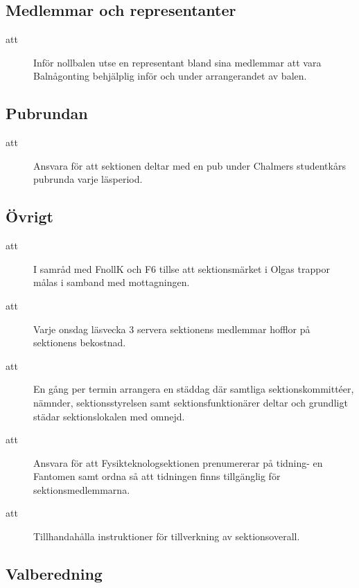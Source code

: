 \subsection{Medlemmar och representanter}

\begin{description}
\item[att] Inför nollbalen utse en representant bland sina medlemmar att vara Balnågonting behjälplig inför och under arrangerandet av balen.
\end{description}

\subsection{Pubrundan}
\begin{description}
\item[att] Ansvara för att sektionen deltar med en pub under Chalmers studentkårs pubrunda varje läsperiod.

\end{description}


\subsection{Övrigt}
\begin{description}
\item[att] I samråd med FnollK och F6 tillse att sektionsmärket i Olgas trappor målas i samband med mottagningen.

\item[att] Varje onsdag läsvecka 3 servera sektionens medlemmar hofflor på sektionens bekostnad.

\item[att] En gång per termin arrangera en städdag där samtliga sektionskommittéer, nämnder, sektionsstyrelsen samt sektionsfunktionärer deltar och grundligt städar sektionslokalen med omnejd.

\item[att] Ansvara för att Fysikteknologsektionen prenumererar på tidning-
en Fantomen samt ordna så att tidningen finns tillgänglig för
sektionsmedlemmarna.

\item[att] Tillhandahålla instruktioner för tillverkning av sektionsoverall.
\end{description}

\subsection{Valberedning}
